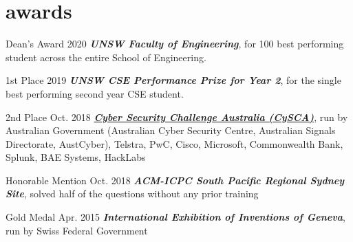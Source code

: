 \documentclass[hidelinks__VERSION__]{adamyi-cv}
\begin{document}
\section{awards}

\begin{entrylist}


\entry
{Dean's Award}
{2020}
{\emph{\textbf{UNSW Faculty of Engineering}}, for 100 best performing student across the entire School of Engineering.}


\entry
{1st Place}
{2019}
{\emph{\textbf{UNSW CSE Performance Prize for Year 2}}, for the single best performing second year CSE student.}


\entry
{2nd Place}
{Oct. 2018}
{\emph{\textbf{\href{https://www.cyberchallenge.com.au/}{Cyber Security Challenge Australia (CySCA)}}}, run by Australian Government (Australian Cyber Security Centre, Australian Signals Directorate, AustCyber), Telstra, PwC, Cisco, Microsoft, Commonwealth Bank, Splunk, BAE Systems, HackLabs}


\entry
{Honorable Mention}
{Oct. 2018}
{\emph{\textbf{ACM-ICPC South Pacific Regional Sydney Site}}, solved half of the questions without any prior training}


\entry
{Gold Medal}
{Apr. 2015}
{\emph{\textbf{International Exhibition of Inventions of Geneva}}, run by Swiss Federal Government}


\end{entrylist}

\end{document}
